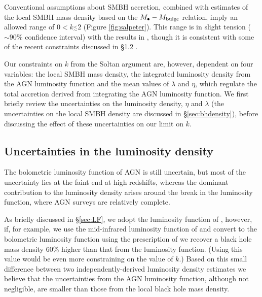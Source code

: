 \documentclass[twocolumn]{aastex631}
\begin{document}
Conventional assumptions about SMBH accretion, combined with estimates of the local SMBH mass density based on the $M_{\bullet}-M_{\rm bulge}$ relation, imply an allowed range of $0<k\stackrel{<}{_{\sim}}2$ (Figure \ref{fig:salpeter}). This range is in slight tension ($\sim90\%$ confidence interval) with the results in \citet{2023ApJ...944L..31F}, though it is consistent with some of the recent constraints discussed in \S 1.2 \citep[e.g.][]{2023arXiv230503408L,rodriguez23, andrae23,2023OJAp....6E..25G}. 

Our constraints on $k$ from the Soltan argument are, however, dependent on four variables: the local SMBH mass density, the integrated luminosity density from the AGN luminosity function and the mean values of $\lambda$ and $\eta$, which regulate the total accretion derived from integrating the AGN luminosity function. We first briefly review the uncertainties on the luminosity density,  $\eta$ and $\lambda$ (the uncertainties on the local SMBH density are discussed in \S\ref{sec:bhdensity}), before discussing the effect of these uncertainties on our limit on $k$. 

\subsection{Uncertainties in the luminosity density}

The bolometric luminosity function of AGN is still uncertain, but most of the uncertainty lies at the faint end at high redshifts, whereas the dominant contribution to the luminosity density arises around the break in the luminosity function, where AGN surveys are relatively complete. 

As briefly discussed in \S \ref{sec:LF}, we adopt the luminosity function of \citet{2020MNRAS.495.3252S}, however, if, for example, we use the mid-infrared luminosity function of \citet{2018ApJ...861...37G} and convert to the bolometric luminosity function using the prescription of 
\citet{2015ApJ...802..102L} we recover a black hole mass density 60\% higher than that from the \citet{2020MNRAS.495.3252S} luminosity function. (Using this value would be even more constraining on the value of $k$.) Based on this small difference between two independently-derived luminosity density estimates we believe that the uncertainties from the AGN luminosity function, although not negligible, are smaller than those from the local black hole mass density.
\end{document}
